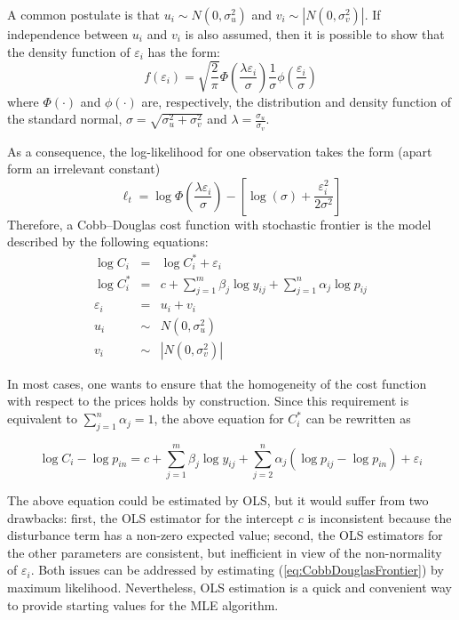 A common postulate is that $u_i \sim N(0,\sigma_u^2)$ and
$v_i \sim \left|N(0,\sigma_v^2)\right|$. If independence between $u_i$
and $v_i$ is also assumed, then it is possible to show that the
density function of $\varepsilon_i$ has the form:
\begin{equation}
  \label{eq:frontdens}
  f(\varepsilon_i) = 
   \sqrt{\frac{2}{\pi}} 
   \Phi\left(\frac{\lambda \varepsilon_i}{\sigma}\right)
   \frac{1}{\sigma} \phi\left(\frac{\varepsilon_i}{\sigma}\right)
\end{equation}
where $\Phi(\cdot)$ and $\phi(\cdot)$ are, respectively, the distribution and density
function of the standard normal, $\sigma =
\sqrt{\sigma^2_u + \sigma^2_v}$ and $\lambda = \frac{\sigma_u}{\sigma_v}$.

As a consequence, the log-likelihood for one observation takes the
form (apart form an irrelevant constant)
\[
  \ell_t = 
  \log\Phi\left(\frac{\lambda \varepsilon_i}{\sigma}\right) -
  \left[ \log(\sigma) + \frac{\varepsilon_i^2}{2 \sigma^2} \right]
\]
Therefore, a Cobb--Douglas cost function with stochastic frontier is the
model described by the following equations: 
\begin{eqnarray*}
  \log C_i & = & \log C^*_i + \varepsilon_i \\
  \log C^*_i & = & c + \sum_{j=1}^m \beta_j \log y_{ij} + \sum_{j=1}^n \alpha_j \log p_{ij} \\
  \varepsilon_i & = & u_i + v_i \\
  u_i & \sim & N(0,\sigma_u^2) \\
  v_i & \sim & \left|N(0,\sigma_v^2)\right| 
\end{eqnarray*}

In most cases, one wants to ensure that the homogeneity of the cost
function with respect to the prices holds by construction. Since this
requirement is equivalent to $\sum_{j=1}^n \alpha_j = 1$, the above
equation for $C^*_i$ can be rewritten as

\begin{equation}
  \label{eq:CobbDouglasFrontier}
  \log C_i - \log p_{in}  = c + \sum_{j=1}^m \beta_j \log y_{ij} +
  \sum_{j=2}^n \alpha_j (\log p_{ij} - \log p_{in})  + \varepsilon_i
\end{equation}

The above equation could be estimated by OLS, but it would suffer from
two drawbacks: first, the OLS estimator for the intercept $c$ is
inconsistent because the disturbance term has a non-zero expected
value; second, the OLS estimators for the other parameters are
consistent, but inefficient in view of the non-normality of
$\varepsilon_i$. Both issues can be addressed by estimating
(\ref{eq:CobbDouglasFrontier}) by maximum likelihood. Nevertheless,
OLS estimation is a quick and convenient way to provide starting
values for the MLE algorithm.

